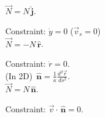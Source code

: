 \documentclass[twoside]{scrartcl}
\let\oldhat\hat
\renewcommand{\hat}[1]{\,\oldhat{\boldsymbol{\mathbf{#1}}}}
\begin{document}
\begin{minipage}[c]{6cm}
  $\vec{N} = N\hat{j}$. 
  
  Constraint: $\dot{y} = 0$ ($\vec{v}_s = 0$)\\[2cm]
  
  $\vec{N} = -N\hat{r}$.
  
  Constraint: $\dot{r} = 0$.\\[1.5cm]
  
  (In 2D) $\hat{n} = \frac{1}{\kappa}\frac{d^2\vec{r}}{ds^2}$.\\[0.1cm]
  
  $\vec{N} = N\hat{n}$.
  
  Constraint: $\vec{v} \cdot \hat{n} = 0$.\\[1cm] 
 \end{minipage}
 
\end{document}
